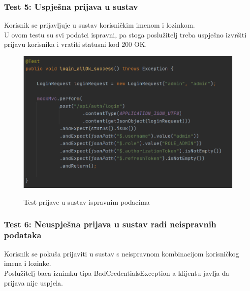 			\subsubsection{Test 5: Uspješna prijava u sustav}
			Korisnik se prijavljuje u sustav korisničkim imenom i lozinkom. \\
			U ovom testu su svi podatci ispravni, pa stoga poslužitelj treba uspješno izvršiti prijavu korisnika i vratiti statusni kod 200 OK.
			
			\begin{figure}[H]
				\centering
				\includegraphics[scale=0.75]{slike/test5} \\
				\caption{ Test prijave u sustav ispravnim podacima}
				\label{fig:test5}
			\end{figure}
		
			\subsubsection{Test 6: Neuspješna prijava u sustav radi neispravnih podataka}
			Korisnik se pokuša prijaviti u sustav s neispravnom kombinacijom korisničkog imena i lozinke. \\
			Poslužitelj baca iznimku tipa BadCredentialsException a klijentu javlja da prijava nije uspjela.
			
